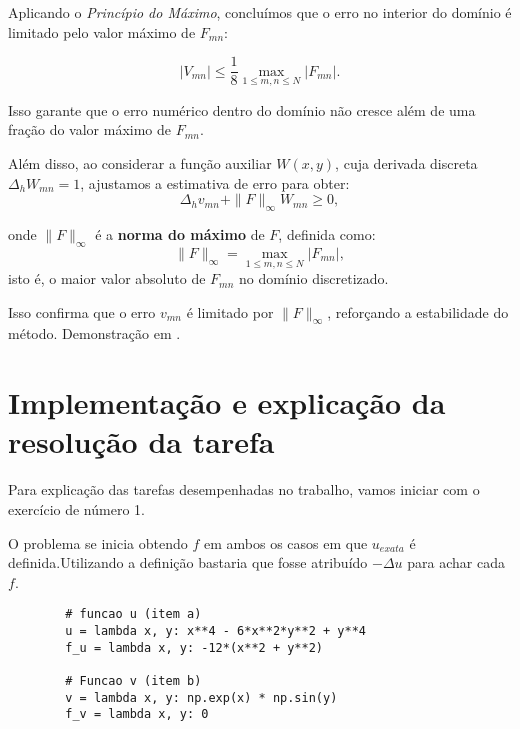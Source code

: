 \documentclass[column,amsmath,amssymb,floatfix]{revtex4}
\begin{document}
                Aplicando o \textit{Princípio do Máximo}, concluímos que o erro no interior do domínio é limitado pelo valor máximo de $F_{mn}$:

                \begin{equation*}
                    |V_{mn}| \leq \frac{1}{8} \max_{1 \leq m,n \leq N} |F_{mn}|.
                \end{equation*}

                Isso garante que o erro numérico dentro do domínio não cresce além de uma fração do valor máximo de $F_{mn}$.
                
                Além disso, ao considerar a função auxiliar $W(x, y)$, cuja derivada discreta $\Delta_h W_{mn} = 1$, ajustamos a estimativa de erro para obter:
                \begin{equation*}
                    \Delta_h v_{mn} + \|F\|_\infty W_{mn} \geq 0,
                \end{equation*}
                
                onde $\|F\|_\infty$ é a \textbf{norma do máximo} de $F$, definida como:
                \begin{equation*}
                    \|F\|_\infty = \max_{1 \leq m,n \leq N} |F_{mn}|,
                \end{equation*}
                isto é, o maior valor absoluto de $F_{mn}$ no domínio discretizado.
                
                Isso confirma que o erro $v_{mn}$ é limitado por $\|F\|_\infty$, reforçando a estabilidade do método. Demonstração em \cite{Kuhl2024}.
                
    \section{Implementação e explicação da resolução da tarefa}

        Para explicação das tarefas desempenhadas no trabalho, vamos iniciar com o exercício de número 1.
                    
        O problema se inicia obtendo $f$ em ambos os casos em que $u_{exata}$ é definida.Utilizando a definição bastaria que fosse atribuído $-\Delta u$ para achar cada $f$. 

        \begin{lstlisting}
        # funcao u (item a)
        u = lambda x, y: x**4 - 6*x**2*y**2 + y**4
        f_u = lambda x, y: -12*(x**2 + y**2)
        
        # Funcao v (item b)
        v = lambda x, y: np.exp(x) * np.sin(y)
        f_v = lambda x, y: 0
        \end{lstlisting}
\end{document}
